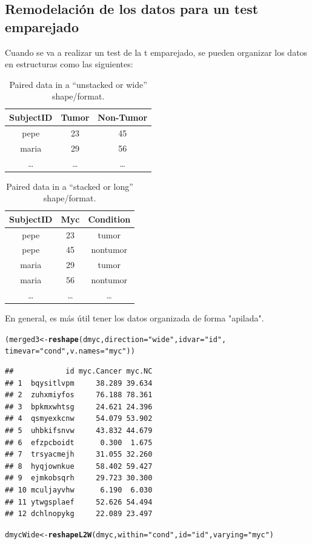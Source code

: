 \documentclass{config/apuntes}\usepackage[]{graphicx}\usepackage[]{xcolor}
\makeatletter
\newcommand{\hlsng}[1]{\textcolor[rgb]{0.192,0.494,0.8}{#1}}%
\newcommand{\hldef}[1]{\textcolor[rgb]{0.345,0.345,0.345}{#1}}%
\newcommand{\hlkwb}[1]{\textcolor[rgb]{0.69,0.353,0.396}{#1}}%
\newcommand{\hlkwc}[1]{\textcolor[rgb]{0.333,0.667,0.333}{#1}}%
\newcommand{\hlkwd}[1]{\textcolor[rgb]{0.737,0.353,0.396}{\textbf{#1}}}%
\newenvironment{kframe}{%
 \def\at@end@of@kframe{}%
 \ifinner\ifhmode%
  \def\at@end@of@kframe{\end{minipage}}%
  \begin{minipage}{\columnwidth}%
 \fi\fi%
 \def\FrameCommand##1{\hskip\@totalleftmargin \hskip-\fboxsep
 \colorbox{shadecolor}{##1}\hskip-\fboxsep
     \hskip-\linewidth \hskip-\@totalleftmargin \hskip\columnwidth}%
 \MakeFramed {\advance\hsize-\width
   \@totalleftmargin\z@ \linewidth\hsize
   \@setminipage}}%
 {\par\unskip\endMakeFramed%
 \at@end@of@kframe}
\newenvironment{knitrout}{}{} %
\makeatother
\begin{document}
\subsection{Remodelación de los datos para un test emparejado}
Cuando se va a realizar un test de la t emparejado, se pueden organizar los datos en estructuras como las siguientes:

\begin{table}[h!]
\centering
\begin{tabular}{ccc}
  SubjectID&Tumor&Non-Tumor\\
  \hline
  pepe&23&45\\
  maria&29&56\\
  \ldots&\ldots&\ldots\\
\end{tabular}
\caption{Paired data in a ``unstacked or wide'' shape/format.}\label{unstacked}
\end{table}

\begin{table}[h!]
\centering
\begin{tabular}{ccc}
  SubjectID&Myc&Condition\\
  \hline
  pepe&23&tumor\\
  pepe&45&nontumor\\
  maria&29&tumor\\
  maria&56&nontumor\\
  \ldots&\ldots&\ldots\\
\end{tabular}
\caption{Paired data in a ``stacked or long'' shape/format.}\label{stacked}
\end{table}

En general, es más útil tener los datos organizada de forma "apilada".
\newpage
\begin{knitrout}
\color{fgcolor}\begin{kframe}
\begin{alltt}
\hldef{(merged3} \hlkwb{<-} \hlkwd{reshape}\hldef{(dmyc,} \hlkwc{direction} \hldef{=} \hlsng{"wide"}\hldef{,} \hlkwc{idvar} \hldef{=} \hlsng{"id"}\hldef{,}
                    \hlkwc{timevar} \hldef{=} \hlsng{"cond"}\hldef{,} \hlkwc{v.names} \hldef{=} \hlsng{"myc"}\hldef{))}
\end{alltt}
\begin{verbatim}
##            id myc.Cancer myc.NC
## 1  bqysitlvpm     38.289 39.634
## 2  zuhxmiyfos     76.188 78.361
## 3  bpkmxwhtsg     24.621 24.396
## 4  qsmyexkcnw     54.079 53.902
## 5  uhbkifsnvw     43.832 44.679
## 6  efzpcboidt      0.300  1.675
## 7  trsyacmejh     31.055 32.260
## 8  hyqjownkue     58.402 59.427
## 9  ejmkobsqrh     29.723 30.300
## 10 mculjayvhw      6.190  6.030
## 11 ytwgsplaef     52.626 54.494
## 12 dchlnopykg     22.089 23.497
\end{verbatim}
\begin{alltt}
\hldef{dmycWide} \hlkwb{<-} \hlkwd{reshapeL2W}\hldef{(dmyc,} \hlkwc{within}\hldef{=}\hlsng{"cond"}\hldef{,} \hlkwc{id}\hldef{=}\hlsng{"id"}\hldef{,} \hlkwc{varying}\hldef{=}\hlsng{"myc"}\hldef{)}
\end{alltt}
\end{kframe}
\end{knitrout}
\end{document}
